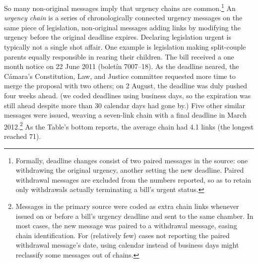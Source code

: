\documentclass[letter,12pt]{article}
\begin{document}
So many non-original messages imply that urgency chains are common.\footnote{Formally, deadline changes consist of two paired messages in the source: one withdrawing the original urgency, another setting the new deadline. Paired withdrawal messages are excluded from the numbers reported, so as to retain only withdrawals actually terminating a bill's urgent status.} An \emph{urgency chain} is a series of chronologically connected urgency messages on the same piece of legislation, non-original messages adding links by modifying the urgency before the original deadline expires. Declaring legislation urgent is typically not a single shot affair. One example is legislation making split-couple parents equally responsible in rearing their children. The bill received a one month notice on 22 June 2011 (bolet\'in 7007--18). As the deadline neared, the C\'amara's Constitution, Law, and Justice committee requested more time to merge the proposal with two others; on 2 August, the deadline was duly pushed four weeks ahead. (we coded deadlines using business days, so the expiration was still ahead despite more than 30 calendar days had gone by.) Five other similar messages were issued, weaving a seven-link chain with a final deadline in March 2012.\footnote{Messages in the primary source were coded as extra chain links whenever issued on or before a bill's urgency deadline and sent to the same chamber. In most cases, the new message was paired to a withdrawal message, easing chain identification. For (relatively few) cases not reporting the paired withdrawal message's date, using calendar instead of business days might reclassify some messages out of chains.} As the Table's bottom reports, the average chain had 4.1 links (the longest reached 71). 
\end{document}
